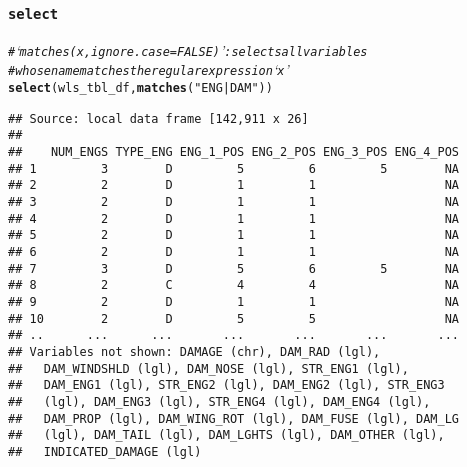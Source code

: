 \documentclass{beamer}\usepackage[]{graphicx}\usepackage[]{color}
\makeatletter
\newcommand{\hlstr}[1]{\textcolor[rgb]{0.192,0.494,0.8}{#1}}%
\newcommand{\hlcom}[1]{\textcolor[rgb]{0.678,0.584,0.686}{\textit{#1}}}%
\newcommand{\hlstd}[1]{\textcolor[rgb]{0.345,0.345,0.345}{#1}}%
\newcommand{\hlkwd}[1]{\textcolor[rgb]{0.737,0.353,0.396}{\textbf{#1}}}%
\newenvironment{kframe}{%
 \def\at@end@of@kframe{}%
 \ifinner\ifhmode%
  \def\at@end@of@kframe{\end{minipage}}%
  \begin{minipage}{\columnwidth}%
 \fi\fi%
 \def\FrameCommand##1{\hskip\@totalleftmargin \hskip-\fboxsep
 \colorbox{shadecolor}{##1}\hskip-\fboxsep
     \hskip-\linewidth \hskip-\@totalleftmargin \hskip\columnwidth}%
 \MakeFramed {\advance\hsize-\width
   \@totalleftmargin\z@ \linewidth\hsize
   \@setminipage}}%
 {\par\unskip\endMakeFramed%
 \at@end@of@kframe}
\newenvironment{knitrout}{}{} %
\makeatother
\begin{document}
\begin{frame}[fragile]
  \frametitle{{\tt select}}
\begin{knitrout}\footnotesize
{}\color{fgcolor}\begin{kframe}
\begin{alltt}
\hlcom{# ‘matches(x, ignore.case = FALSE)’: selects all variables}
\hlcom{# whose name matches the regular expression ‘x’}
\hlkwd{select}\hlstd{(wls_tbl_df,} \hlkwd{matches}\hlstd{(}\hlstr{"ENG|DAM"}\hlstd{))}
\end{alltt}
\begin{verbatim}
## Source: local data frame [142,911 x 26]
## 
##    NUM_ENGS TYPE_ENG ENG_1_POS ENG_2_POS ENG_3_POS ENG_4_POS
## 1         3        D         5         6         5        NA
## 2         2        D         1         1                  NA
## 3         2        D         1         1                  NA
## 4         2        D         1         1                  NA
## 5         2        D         1         1                  NA
## 6         2        D         1         1                  NA
## 7         3        D         5         6         5        NA
## 8         2        C         4         4                  NA
## 9         2        D         1         1                  NA
## 10        2        D         5         5                  NA
## ..      ...      ...       ...       ...       ...       ...
## Variables not shown: DAMAGE (chr), DAM_RAD (lgl),
##   DAM_WINDSHLD (lgl), DAM_NOSE (lgl), STR_ENG1 (lgl),
##   DAM_ENG1 (lgl), STR_ENG2 (lgl), DAM_ENG2 (lgl), STR_ENG3
##   (lgl), DAM_ENG3 (lgl), STR_ENG4 (lgl), DAM_ENG4 (lgl),
##   DAM_PROP (lgl), DAM_WING_ROT (lgl), DAM_FUSE (lgl), DAM_LG
##   (lgl), DAM_TAIL (lgl), DAM_LGHTS (lgl), DAM_OTHER (lgl),
##   INDICATED_DAMAGE (lgl)
\end{verbatim}
\end{kframe}
\end{knitrout}
\end{frame} 
\end{document}

